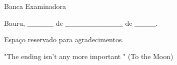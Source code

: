 \documentclass[
	12pt,				%
	openright,			%
	oneside,			%
	a4paper,			%
	english,			%
	french,				%
	spanish,			%
	brazil,				%
	]{abntex2}
\begin{document}
\begin{folhadeaprovacao}
  \begin{center}
    {\ABNTEXchapterfont\large\imprimirautor}
    \vspace*{\fill}\vspace*{\fill}
    \begin{center}
      \ABNTEXchapterfont\bfseries\Large\imprimirtitulo
    \end{center}
    \vspace*{\fill}
    \hspace{.45\textwidth}
    \begin{minipage}{.5\textwidth}
        \imprimirpreambulo
    \end{minipage}%
    \vspace*{\fill}
   \end{center}
   \center Banca Examinadora
   \begin{center}
    \vspace*{0.5cm}
    \par
    {Bauru, \_\_\_\_\_ de \_\_\_\_\_\_\_\_\_\_\_ de \_\_\_\_.}
    \vspace*{1cm}
  \end{center}
\end{folhadeaprovacao}


\begin{agradecimentos}

Espaço reservado para agradecimentos.

\end{agradecimentos}

\begin{epigrafe}
    \vspace*{\fill}
	\begin{flushright}
		"The ending isn’t any more important \linebreak {}" \newline 
		(To the Moon) 
	\end{flushright}
\end{epigrafe}
\end{document}
